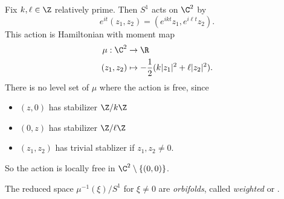 \documentclass[a4paper]{article}
\begin{document}
\begin{eg}
  Fix $k, \ell \in \Z$ relatively prime. Then $S^1$ acts on $\C^2$ by
  \[
    e^{it} (z_1, z_2) = (e^{ikt} z_1, e^{i\ell t} z_2).
  \]
  This action is Hamiltonian with moment map
  \begin{align*}
    \mu: \C^2 &\to \R\\
    (z_1, z_2) &\mapsto - \frac{1}{2} (k |z_1|^2 + \ell |z_2|^2).
  \end{align*}
  There is no level set of $\mu$ where the action is free, since
  \begin{itemize}
    \item $(z, 0)$ has stabilizer $\Z/k\Z$
    \item $(0, z)$ has stabilizer $\Z/\ell \Z$
    \item $(z_1, z_2)$ has trivial stablizer if $z_1, z_2 \not= 0$.
  \end{itemize}
  So the action is locally free in $\C^2 \setminus \{(0, 0)\}$.

  The reduced space $\mu^{-1}(\xi)/S^1$ for $\xi \not= 0$ are \emph{orbifolds}, called \emph{weighted} or .
\end{eg}
\end{document}
